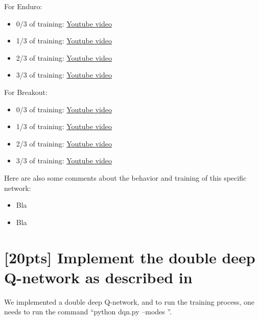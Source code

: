 \documentclass{article}
\begin{document}
For Enduro:
\begin{itemize}
  \item 0/3 of training: \href{http://www.sharelatex.com}{Youtube video}
  \item 1/3 of training: \href{http://www.sharelatex.com}{Youtube video}
  \item 2/3 of training: \href{http://www.sharelatex.com}{Youtube video}
  \item 3/3 of training: \href{http://www.sharelatex.com}{Youtube video}
\end{itemize}

For Breakout:
\begin{itemize}
  \item 0/3 of training: \href{http://www.sharelatex.com}{Youtube video}
  \item 1/3 of training: \href{http://www.sharelatex.com}{Youtube video}
  \item 2/3 of training: \href{http://www.sharelatex.com}{Youtube video}
  \item 3/3 of training: \href{http://www.sharelatex.com}{Youtube video}
\end{itemize}

Here are also some comments about the behavior and training of this specific network:

\begin{itemize}
  \item Bla
  \item Bla
\end{itemize}

\section{[20pts] Implement the double deep Q-network as described in \cite{van2016deep}}

We implemented a double deep Q-network, and to run the training process, one needs to run the command ``python dqn.py --modes ''.
\end{document}
